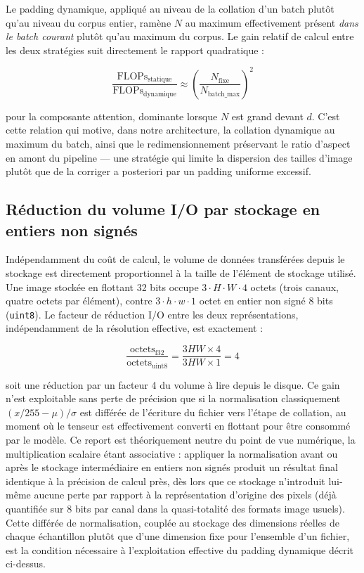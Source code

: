 \documentclass[12pt,a4paper]{report}
\begin{document}
Le padding dynamique, appliqué au niveau de la collation d'un batch plutôt qu'au niveau du corpus entier, ramène $N$ au maximum effectivement présent \emph{dans le batch courant} plutôt qu'au maximum du corpus. Le gain relatif de calcul entre les deux stratégies suit directement le rapport quadratique :

\begin{equation}
\label{eq:gain_padding}
\frac{\text{FLOPs}_{\text{statique}}}{\text{FLOPs}_{\text{dynamique}}} \approx \left(\frac{N_{\text{fixe}}}{N_{\text{batch\_max}}}\right)^2
\end{equation}

pour la composante attention, dominante lorsque $N$ est grand devant $d$. C'est cette relation qui motive, dans notre architecture, la collation dynamique au maximum du batch, ainsi que le redimensionnement préservant le ratio d'aspect en amont du pipeline — une stratégie qui limite la dispersion des tailles d'image plutôt que de la corriger a posteriori par un padding uniforme excessif.

\subsection{Réduction du volume I/O par stockage en entiers non signés}

Indépendamment du coût de calcul, le volume de données transférées depuis le stockage est directement proportionnel à la taille de l'élément de stockage utilisé. Une image stockée en flottant 32 bits occupe $3 \cdot H \cdot W \cdot 4$ octets (trois canaux, quatre octets par élément), contre $3 \cdot h \cdot w \cdot 1$ octet en entier non signé 8 bits (\texttt{uint8}). Le facteur de réduction I/O entre les deux représentations, indépendamment de la résolution effective, est exactement :

\begin{equation}
\label{eq:reduction_io}
\frac{\text{octets}_{\text{f32}}}{\text{octets}_{\text{uint8}}} = \frac{3 H W \times 4}{3 H W \times 1} = 4
\end{equation}

soit une réduction par un facteur 4 du volume à lire depuis le disque. Ce gain n'est exploitable sans perte de précision que si la normalisation classiquement $(x/255 - \mu)/\sigma$ est différée de l'écriture du fichier vers l'étape de collation, au moment où le tenseur est effectivement converti en flottant pour être consommé par le modèle. Ce report est théoriquement neutre du point de vue numérique, la multiplication scalaire étant associative : appliquer la normalisation avant ou après le stockage intermédiaire en entiers non signés produit un résultat final identique à la précision de calcul près, dès lors que ce stockage n'introduit lui-même aucune perte par rapport à la représentation d'origine des pixels (déjà quantifiée sur 8 bits par canal dans la quasi-totalité des formats image usuels). Cette différée de normalisation, couplée au stockage des dimensions réelles de chaque échantillon plutôt que d'une dimension fixe pour l'ensemble d'un fichier, est la condition nécessaire à l'exploitation effective du padding dynamique décrit ci-dessus.
\end{document}
